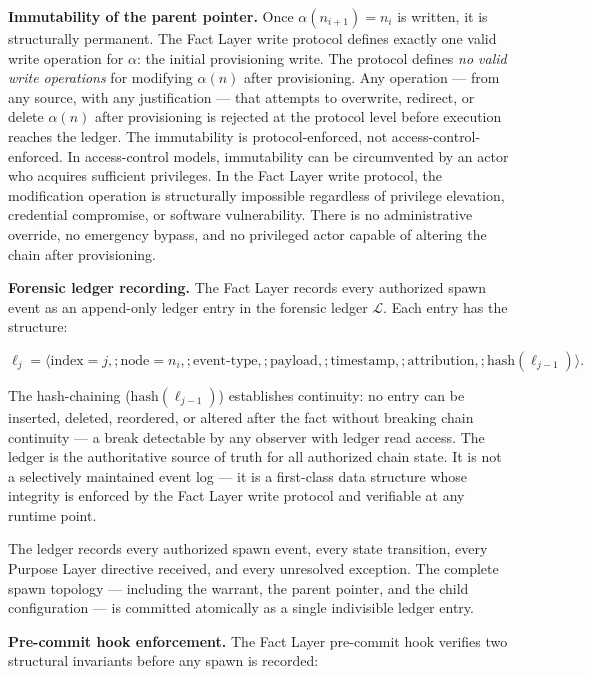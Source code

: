 \medskip
\noindent\textbf{Immutability of the parent pointer.} Once $\alpha(n_{i+1}) = n_i$ is written, it is structurally permanent. The Fact Layer write protocol defines exactly one valid write operation for $\alpha$: the initial provisioning write. The protocol defines \emph{no valid write operations} for modifying $\alpha(n)$ after provisioning. Any operation --- from any source, with any justification --- that attempts to overwrite, redirect, or delete $\alpha(n)$ after provisioning is rejected at the protocol level before execution reaches the ledger. The immutability is protocol-enforced, not access-control-enforced. In access-control models, immutability can be circumvented by an actor who acquires sufficient privileges. In the Fact Layer write protocol, the modification operation is structurally impossible regardless of privilege elevation, credential compromise, or software vulnerability. There is no administrative override, no emergency bypass, and no privileged actor capable of altering the chain after provisioning.

\medskip
\noindent\textbf{Forensic ledger recording.} The Fact Layer records every authorized spawn event as an append-only ledger entry in the forensic ledger $\mathcal{L}$. Each entry has the structure:

\begin{equation}
\ell_j = \bigl\langle
\text{index}=j,;
\text{node}=n_i,;
\text{event-type},;
\text{payload},;
\text{timestamp},;
\text{attribution},;
\text{hash}(\ell_{j-1})
\bigr\rangle .
\label{eq:ledger-entry}
\end{equation}

The hash-chaining ($\text{hash}(\ell_{j-1})$) establishes continuity: no entry can be inserted, deleted, reordered, or altered after the fact without breaking chain continuity --- a break detectable by any observer with ledger read access. The ledger is the authoritative source of truth for all authorized chain state. It is not a selectively maintained event log --- it is a first-class data structure whose integrity is enforced by the Fact Layer write protocol and verifiable at any runtime point.

The ledger records every authorized spawn event, every state transition, every Purpose Layer directive received, and every unresolved exception. The complete spawn topology --- including the warrant, the parent pointer, and the child configuration --- is committed atomically as a single indivisible ledger entry.

\medskip
\noindent\textbf{Pre-commit hook enforcement.} The Fact Layer pre-commit hook verifies two structural invariants before any spawn is recorded:

